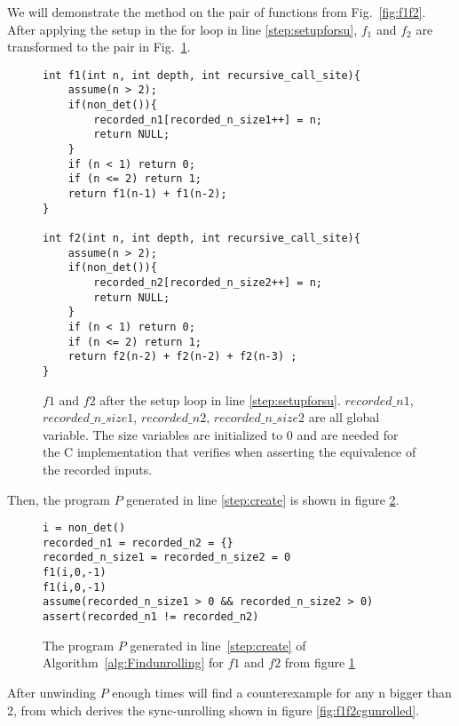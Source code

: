 We will demonstrate the method on the pair of functions from Fig.~\ref{fig:f1f2}. After applying the setup in the for loop in line \ref{step:setupforsu}, $f_1$ and $f_2$ are transformed to the pair in Fig.~\ref{fig:f1f2susetup}.
\begin{figure}[h]
\begin{center}
\begin{lstlisting}
int f1(int n, int depth, int recursive_call_site){
    assume(n > 2);
    if(non_det()){
        recorded_n1[recorded_n_size1++] = n;
        return NULL;
    }
    if (n < 1) return 0;
    if (n <= 2) return 1; 
    return f1(n-1) + f1(n-2);
}

int f2(int n, int depth, int recursive_call_site){
    assume(n > 2);
    if(non_det()){
        recorded_n2[recorded_n_size2++] = n;
        return NULL;
    }
    if (n < 1) return 0;
    if (n <= 2) return 1;
    return f2(n-2) + f2(n-2) + f2(n-3) ;
}
\end{lstlisting}
\caption{$f1$ and $f2$ after the setup loop in line \ref{step:setupforsu}. $recorded\_n1$, $recorded\_n\_size1$, $recorded\_n2$, $recorded\_n\_size2$ are all global variable. The size variables are initialized to 0 and are needed for the C implementation that  verifies when asserting the equivalence of the recorded inputs.}
\label{fig:f1f2susetup}
\end{center}
\end{figure}
%
Then, the program $P$ generated in line \ref{step:create} is shown in figure \ref{fig:findcutverfprogramf1f2}.
\begin{figure} [h]
\begin{center}
\begin{minipage}{7 cm}
\begin{lstlisting}
i = non_det()
recorded_n1 = recorded_n2 = {}
recorded_n_size1 = recorded_n_size2 = 0
f1(i,0,-1)
f1(i,0,-1)
assume(recorded_n_size1 > 0 && recorded_n_size2 > 0)
assert(recorded_n1 != recorded_n2)
\end{lstlisting}
\end{minipage}
\caption{The program $P$ generated in line~\ref{step:create} of Algorithm~\ref{alg:Findunrolling} for $f1$ and $f2$ from figure \ref{fig:f1f2susetup}}
\label{fig:findcutverfprogramf1f2}
\end{center}
\end{figure}
%
After unwinding $P$ enough times  will find a counterexample for any n bigger than 2, from which  derives the sync-unrolling shown in figure \ref{fig:f1f2cgunrolled}.


